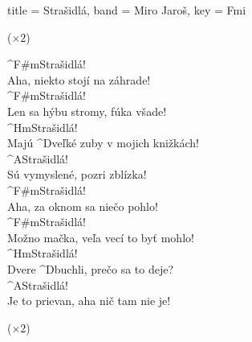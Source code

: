 \begin{song}[
    remember-chords = true ,
    verse/numbered = true ,
    transpose-capo = true 
  ]{
    title = Strašidlá,
    band = Miro Jaroš,
    key  = Fmi
  }
	\begin{chorus}
	($\times2$)
	\end{chorus}
	
	\begin{bridge}
	^{F#m}Strašidlá! \\
	Aha, niekto stojí na záhrade! \\
	^{F#m}Strašidlá! \\
	Len sa hýbu stromy, fúka všade! \\
	^{Hm}Strašidlá! \\
	Majú ^{D}veľké zuby v mojich knižkách! \\
	^{A}Strašidlá! \\
	Sú vymyslené, pozri zblízka! \\
	^{F#m}Strašidlá! \\
	Aha, za oknom sa niečo pohlo! \\
	^{F#m}Strašidlá! \\
	Možno mačka, veľa vecí to byť mohlo! \\
	^{Hm}Strašidlá! \\
	Dvere ^{D}buchli, prečo sa to deje? \\
	^{A}Strašidlá! \\
	Je to prievan, aha nič tam nie je!
	\end{bridge}
	
	\begin{chorus}
	($\times2$)
	\end{chorus}	
	
\end{song}